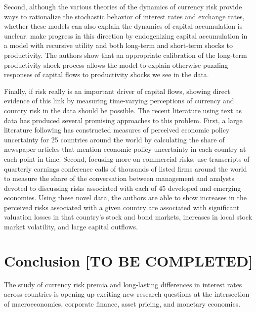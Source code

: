 \documentclass{ar-1col}
\begin{document}
Second, although the various theories of the dynamics of currency risk provide ways to rationalize the stochastic behavior of interest rates and exchange rates, whether these models can also explain the dynamics of capital accumulation is unclear. \citet{ColacitoCroceHoHoward2018} make progress in this direction by endogenizing capital accumulation in a model with recursive utility and both long-term and short-term shocks to productivity. The authors show that an appropriate calibration of the long-term productivity shock process allows the model to explain
otherwise puzzling responses of capital flows to productivity shocks we see in the data. 

Finally, if risk really is an important driver of capital flows, showing direct evidence of this link by measuring time-varying perceptions of currency and country risk in the data should be possible. The recent literature using text as data has produced several promising approaches to this problem. First, a large literature following \cite{baker2016measuring} has constructed measures of perceived economic policy uncertainty for 25 countries around the world by calculating the share of newspaper articles that mention economic policy uncertainty in each country at each point in time. Second, focusing more on commercial risks, \cite{hassan2020country} use transcripts of quarterly earnings conference calls of thousands of listed firms around the world to measure the share of the conversation between management and analysts devoted to discussing risks associated with each of 45 developed and emerging economies. Using these novel data, the authors are able to show increases in the perceived risks associated with a given country are associated with significant valuation losses in that country's stock and bond markets, increases in local stock market volatility, and large capital outflows. 


\section{Conclusion [TO BE COMPLETED]}

The study of currency risk premia and long-lasting differences in interest rates across countries is opening up exciting new research questions at the intersection of macroeconomics, corporate finance, asset pricing, and monetary economics. 



\newpage

 

\clearpage



    
\end{document}
